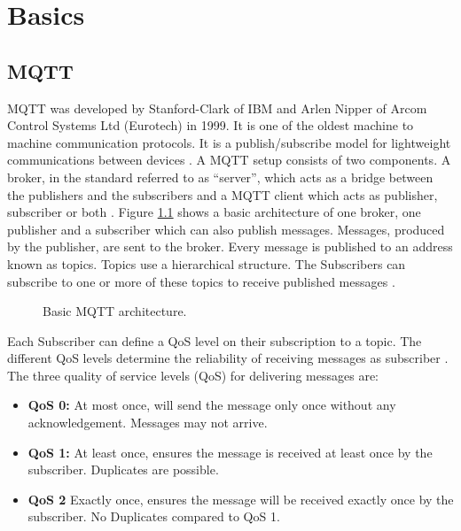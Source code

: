 \chapter{Basics}

\section{MQTT}
\gls{MQTT} was developed by Stanford-Clark of IBM and Arlen Nipper of Arcom Control Systems Ltd (Eurotech) in 1999. It is one of the oldest machine to machine communication protocols. It is a publish/subscribe model for lightweight communications between devices \cite{Naik2017}. A \gls{MQTT} setup consists of two components. A broker, in the standard referred to as “server”, which acts as a bridge between the publishers and the subscribers and a \gls{MQTT} client which acts as publisher, subscriber or both \cite{OASIS2019} \cite{Naik2017} \cite{Bandyopadhyay2013}. Figure \ref{fig:mqtt-architecture} shows a basic architecture of one broker, one publisher and a subscriber which can also publish messages. Messages, produced by the publisher, are sent to the broker. Every message is published to an address known as topics. Topics use a hierarchical structure. The Subscribers can subscribe to one or more of these topics to receive published messages \cite{Bandyopadhyay2013}.

\begin{figure}[H]
    \fontsize{9}{10}\selectfont
    \centering
    \def\svgwidth{\textwidth}
    
    \caption{Basic MQTT architecture.}
    \label{fig:mqtt-architecture}
\end{figure}

Each Subscriber can define a \gls{QoS} level on their subscription to a topic. The different QoS levels determine the reliability of receiving messages as subscriber \cite{OASIS2019}. The three quality of service levels (\gls{QoS}) for delivering messages are: \cite{OASIS2019} 

\begin{itemize}
    \item \textbf{QoS 0:} At most once, will send the message only once without any acknowledgement. Messages may not arrive.
    \item \textbf{QoS 1:} At least once, ensures the message is received at least once by the subscriber. Duplicates are possible.
    \item \textbf{QoS 2} Exactly once, ensures the message will be received exactly once by the subscriber. No Duplicates compared to QoS 1.
\end{itemize}


